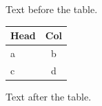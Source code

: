\documentclass[12pt]{article}
\begin{document}
Text before the table.

\begin{tabular}{lc}\hline Head & Col\\\hline a & b\\c & d\\\hline\end{tabular}

Text after the table.
\end{document}
